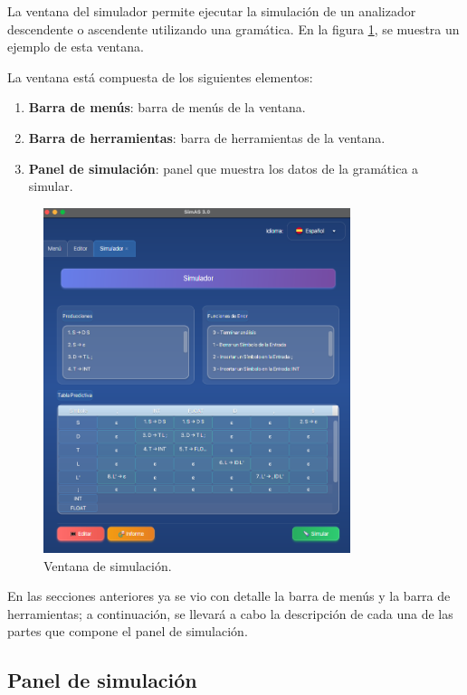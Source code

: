 La ventana del simulador permite ejecutar la simulación de un analizador descendente o ascendente utilizando una gramática. En la figura \ref{fig:d5}, se muestra un ejemplo de esta ventana.

La ventana está compuesta de los siguientes elementos:
\begin{enumerate}
 \item \textbf{Barra de menús}: barra de menús de la ventana.
 \item \textbf{Barra de herramientas}: barra de herramientas de la ventana.
 \item \textbf{Panel de simulación}: panel que muestra los datos de la gramática a simular.
\end{enumerate}

\begin{figure}[htp]
\centering
	\includegraphics[width=0.8\textwidth]{figuras2/ejemplo_practico/simulador.png}
	\caption{Ventana de simulación.}
	\label{fig:d5}
\end{figure}

  En las secciones anteriores ya se vio con detalle la barra de menús y la barra de herramientas; a continuación, se llevará a cabo la descripción de cada una de las partes que compone el panel de simulación.



\subsection{Panel de simulación}


